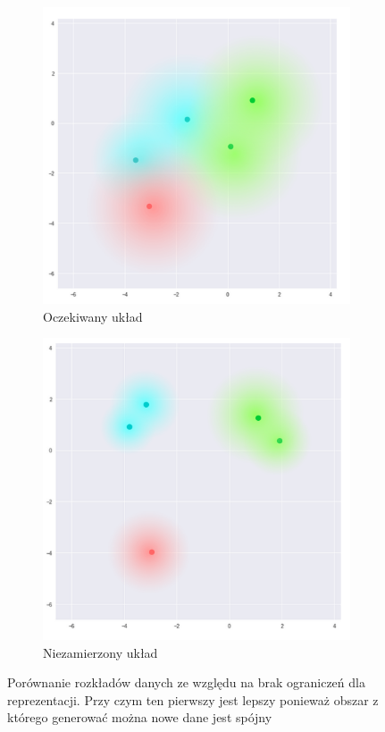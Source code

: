 \begin{figure}[h!]
  \centering
  \begin{subfigure}[b]{0.4\linewidth}
    \includegraphics[width=1.0\textwidth]{images/vae_nolimits_a}
    \caption{Oczekiwany układ}
  \end{subfigure}
  \begin{subfigure}[b]{0.4\linewidth}
    \includegraphics[width=1.0\textwidth]{images/vae_nolimits_b}
    \caption{Niezamierzony układ}
  \end{subfigure}
  \caption{Porównanie rozkładów danych ze względu na brak ograniczeń dla reprezentacji. Przy czym ten pierwszy jest lepszy ponieważ obszar z którego generować można nowe dane jest spójny}
  \label{fig:vae_nolimits}
\end{figure}


